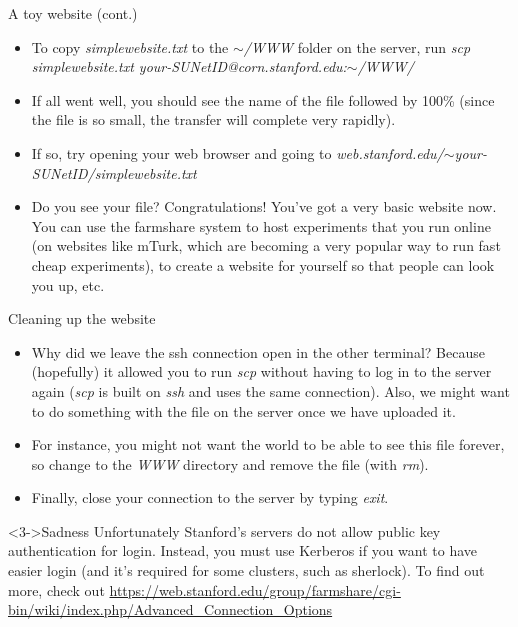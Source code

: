 \documentclass{beamer}
\begin{document}
\begin{frame}{A toy website (cont.)}
\begin{itemize}
    \item<1-> To copy \emph{simplewebsite.txt} to the \emph{$\sim$/WWW} folder on the server, run \emph{scp simplewebsite.txt your-SUNetID@corn.stanford.edu:$\sim$/WWW/} 
    \item<2-> If all went well, you should see the name of the file followed by 100\% (since the file is so small, the transfer will complete very rapidly). 
    \item<2-> If so, try opening your web browser and going to \emph{web.stanford.edu/$\sim$your-SUNetID/simplewebsite.txt} 
    \item<3-> Do you see your file? Congratulations! You've got a very basic website now. You can use the farmshare system to host experiments that you run online (on websites like mTurk, which are becoming a very popular way to run fast cheap experiments), to create a website for yourself so that people can look you up, etc.  
\end{itemize}
\end{frame}

\begin{frame}{Cleaning up the website}
\begin{itemize}
    \item<1-> Why did we leave the ssh connection open in the other terminal? Because (hopefully) it allowed you to run \emph{scp} without having to log in to the server again (\emph{scp} is built on \emph{ssh} and uses the same connection). Also, we might want to do something with the file on the server once we have uploaded it.
    \item<2-> For instance, you might not want the world to be able to see this file forever, so change to the \emph{WWW} directory and remove the file (with \emph{rm}).
    \item<3-> Finally, close your connection to the server by typing \emph{exit}.
\end{itemize}
\begin{alertblock}<3->{Sadness}
Unfortunately Stanford's servers do not allow public key authentication for login. Instead, you must use Kerberos if you want to have easier login (and it's required for some clusters, such as sherlock). To find out more, check out {\color{blue} \url{https://web.stanford.edu/group/farmshare/cgi-bin/wiki/index.php/Advanced_Connection_Options}} 
\end{alertblock}
\end{frame}
\end{document}
